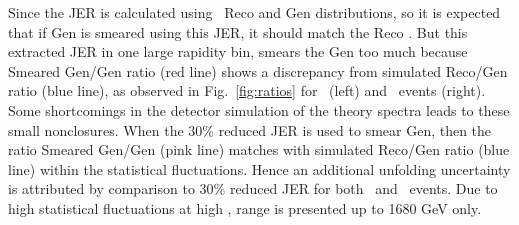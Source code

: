 
Since the JER is calculated using \MGP~Reco and Gen \httwo distributions, so it is expected that if Gen \httwo is smeared using this JER, it should match the Reco \httwo. But this extracted JER in one large rapidity bin, smears the Gen \httwo too much because Smeared Gen/Gen ratio (red line) shows a discrepancy from simulated Reco/Gen ratio (blue line), as observed in Fig.~\ref{fig:ratios} for \njt~(left) and \njth~events (right). Some shortcomings in the detector simulation of the theory spectra leads to these small nonclosures. When the 30\% reduced JER is used to smear Gen, then the ratio Smeared Gen/Gen (pink line) matches with simulated Reco/Gen ratio (blue line) within the statistical fluctuations. Hence an additional unfolding uncertainty is attributed by comparison to 30\% reduced JER for both \njt~and \njth~events. Due to high statistical fluctuations at high \httwons, range is presented up to 1680 GeV only.

